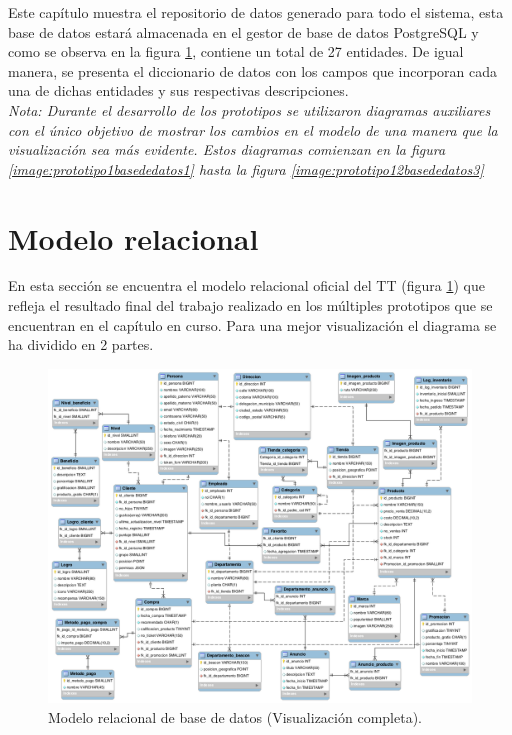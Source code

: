 Este capítulo muestra el repositorio de datos generado para todo el sistema, esta base de datos estará almacenada en el gestor de base de datos PostgreSQL y como se observa en la figura \ref{image:modelorelacional}, contiene un total de 27 entidades. De igual manera, se presenta el diccionario de datos con los campos que incorporan cada una de dichas entidades y sus respectivas descripciones. \\


\textit{Nota: Durante el desarrollo de los prototipos se utilizaron diagramas auxiliares con el único objetivo de mostrar los cambios en el modelo de una manera que la visualización sea más evidente. Estos diagramas comienzan en la figura \ref{image:prototipo1basededatos1} hasta la figura \ref{image:prototipo12basededatos3}}


\section{Modelo relacional}
En esta sección se encuentra el modelo relacional oficial del TT (figura \ref{image:modelorelacional}) que refleja el resultado final del trabajo realizado en los múltiples prototipos que se encuentran en el capítulo en curso. Para una mejor visualización el diagrama se ha dividido en 2 partes.

\FloatBarrier
\begin{figure}[htbp!]
		\centering
			\includegraphics[width=1 \textwidth]{imagenes/modeloDatos/modelorelacional}
		\caption{Modelo relacional de base de datos (Visualización completa).}
		\label{image:modelorelacional}
\end{figure}
\FloatBarrier

